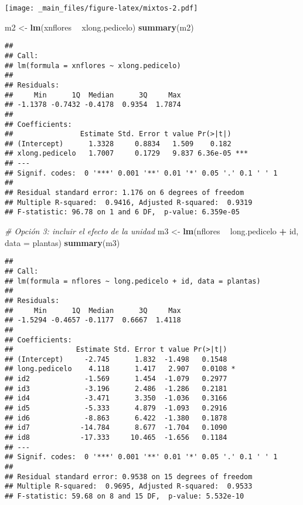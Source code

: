 \documentclass[
]{book}
\newenvironment{Shaded}{\begin{snugshade}}{\end{snugshade}}
\newcommand{\CommentTok}[1]{\textcolor[rgb]{0.56,0.35,0.01}{\textit{#1}}}
\newcommand{\DataTypeTok}[1]{\textcolor[rgb]{0.13,0.29,0.53}{#1}}
\newcommand{\KeywordTok}[1]{\textcolor[rgb]{0.13,0.29,0.53}{\textbf{#1}}}
\newcommand{\NormalTok}[1]{#1}
\newcommand{\OperatorTok}[1]{\textcolor[rgb]{0.81,0.36,0.00}{\textbf{#1}}}
\newcommand{\StringTok}[1]{\textcolor[rgb]{0.31,0.60,0.02}{#1}}
\begin{document}
\texttt{[image: \_main\_files/figure-latex/mixtos-2.pdf]}

\begin{Shaded}
\begin{Highlighting}[]
\NormalTok{m2 <-}\StringTok{ }\KeywordTok{lm}\NormalTok{(xnflores }\OperatorTok{~}\StringTok{ }\NormalTok{xlong.pedicelo)}
\KeywordTok{summary}\NormalTok{(m2)}
\end{Highlighting}
\end{Shaded}

\begin{verbatim}
## 
## Call:
## lm(formula = xnflores ~ xlong.pedicelo)
## 
## Residuals:
##     Min      1Q  Median      3Q     Max 
## -1.1378 -0.7432 -0.4178  0.9354  1.7874 
## 
## Coefficients:
##                Estimate Std. Error t value Pr(>|t|)    
## (Intercept)      1.3328     0.8834   1.509    0.182    
## xlong.pedicelo   1.7007     0.1729   9.837 6.36e-05 ***
## ---
## Signif. codes:  0 '***' 0.001 '**' 0.01 '*' 0.05 '.' 0.1 ' ' 1
## 
## Residual standard error: 1.176 on 6 degrees of freedom
## Multiple R-squared:  0.9416, Adjusted R-squared:  0.9319 
## F-statistic: 96.78 on 1 and 6 DF,  p-value: 6.359e-05
\end{verbatim}

\begin{Shaded}
\begin{Highlighting}[]
\CommentTok{# Opción 3: incluir el efecto de la unidad}
\NormalTok{m3 <-}\StringTok{ }\KeywordTok{lm}\NormalTok{(nflores }\OperatorTok{~}\StringTok{ }\NormalTok{long.pedicelo }\OperatorTok{+}\StringTok{ }\NormalTok{id, }\DataTypeTok{data =}\NormalTok{ plantas)}
\KeywordTok{summary}\NormalTok{(m3)}
\end{Highlighting}
\end{Shaded}

\begin{verbatim}
## 
## Call:
## lm(formula = nflores ~ long.pedicelo + id, data = plantas)
## 
## Residuals:
##     Min      1Q  Median      3Q     Max 
## -1.5294 -0.4657 -0.1177  0.6667  1.4118 
## 
## Coefficients:
##               Estimate Std. Error t value Pr(>|t|)  
## (Intercept)     -2.745      1.832  -1.498   0.1548  
## long.pedicelo    4.118      1.417   2.907   0.0108 *
## id2             -1.569      1.454  -1.079   0.2977  
## id3             -3.196      2.486  -1.286   0.2181  
## id4             -3.471      3.350  -1.036   0.3166  
## id5             -5.333      4.879  -1.093   0.2916  
## id6             -8.863      6.422  -1.380   0.1878  
## id7            -14.784      8.677  -1.704   0.1090  
## id8            -17.333     10.465  -1.656   0.1184  
## ---
## Signif. codes:  0 '***' 0.001 '**' 0.01 '*' 0.05 '.' 0.1 ' ' 1
## 
## Residual standard error: 0.9538 on 15 degrees of freedom
## Multiple R-squared:  0.9695, Adjusted R-squared:  0.9533 
## F-statistic: 59.68 on 8 and 15 DF,  p-value: 5.532e-10
\end{verbatim}
\end{document}
